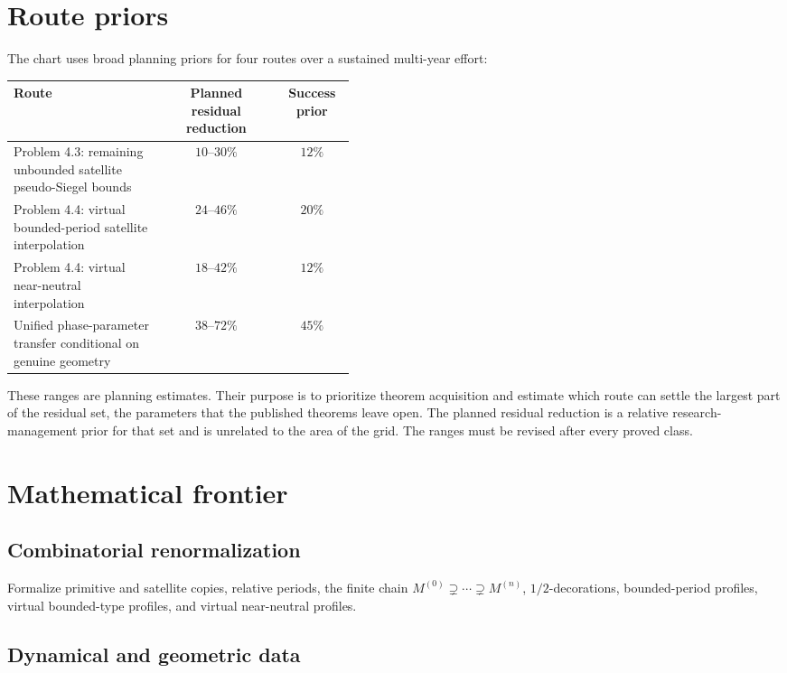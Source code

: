 \documentclass[11pt,a4paper]{article}
\begin{document}
\section{Route priors}

The chart uses broad planning priors for four routes over a sustained
multi-year effort:

\begin{center}
\small
\setlength{\tabcolsep}{4pt}
\begin{tabular}{p{0.44\linewidth}cc}
\toprule
Route & Planned residual reduction & Success prior \\
\midrule
Problem 4.3: remaining unbounded satellite pseudo-Siegel bounds &
\(10\)--\(30\%\) & \(12\%\) \\
Problem 4.4: virtual bounded-period satellite interpolation &
\(24\)--\(46\%\) & \(20\%\) \\
Problem 4.4: virtual near-neutral interpolation &
\(18\)--\(42\%\) & \(12\%\) \\
Unified phase-parameter transfer conditional on genuine geometry &
\(38\)--\(72\%\) & \(45\%\) \\
\bottomrule
\end{tabular}
\end{center}

These ranges are planning estimates. Their purpose is
to prioritize theorem acquisition and estimate which route can settle the largest
part of the residual set, the parameters that the published theorems leave open.
The planned residual reduction is a relative research-management prior for that set
and is unrelated to the area of the grid. The ranges must be revised after every proved
class.

\section{Mathematical frontier}

\subsection{Combinatorial renormalization}

Formalize primitive and satellite copies, relative periods, the finite
chain \(M^{(0)}\supsetneq\cdots\supsetneq M^{(n)}\), \(1/2\)-decorations,
bounded-period profiles, virtual bounded-type profiles, and virtual
near-neutral profiles.

\subsection{Dynamical and geometric data}
\end{document}
